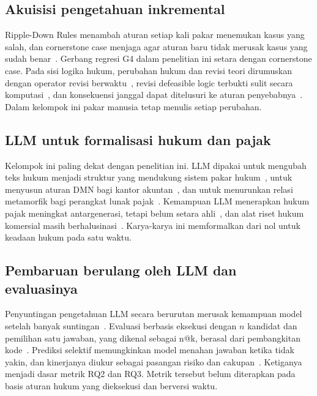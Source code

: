 \documentclass[journal,a4paper]{IEEEtran}
\makeatletter
\DeclareRobustCommand{\en}[1]{{\usefont{\f@encoding}{\f@family}{\f@series}{it}#1\/}}
\makeatother
\begin{document}
\subsection{Akuisisi pengetahuan inkremental}
\en{Ripple-Down Rules} menambah aturan setiap kali pakar menemukan kasus yang salah, dan \en{cornerstone case} menjaga agar aturan baru tidak merusak kasus yang sudah benar~\cite{compton2021rdr}. Gerbang regresi G4 dalam penelitian ini setara dengan \en{cornerstone case}. Pada sisi logika hukum, perubahan hukum dan revisi teori dirumuskan dengan operator revisi berwaktu~\cite{moguillansky2024temporalised}, revisi \en{defeasible logic} terbukti sulit secara komputasi~\cite{olivieri2025revising}, dan konsekuensi janggal dapat ditelusuri ke aturan penyebabnya~\cite{fungwacharakorn2021debugging}. Dalam kelompok ini pakar manusia tetap menulis setiap perubahan.

\subsection{LLM untuk formalisasi hukum dan pajak}
Kelompok ini paling dekat dengan penelitian ini. LLM dipakai untuk mengubah teks hukum menjadi struktur yang mendukung sistem pakar hukum~\cite{janatian2023texttostructure}, untuk menyusun aturan DMN bagi kantor akuntan~\cite{makowski2025dmn}, dan untuk menurunkan relasi metamorfik bagi perangkat lunak pajak~\cite{srinivas2023fewshot,khiabani2026agentic}. Kemampuan LLM menerapkan hukum pajak meningkat antargenerasi, tetapi belum setara ahli~\cite{blairstanek2023gpt3,nay2024taxattorneys}, dan alat riset hukum komersial masih berhalusinasi~\cite{magesh2025hallucination}. Karya-karya ini memformalkan dari nol untuk keadaan hukum pada satu waktu.

\subsection{Pembaruan berulang oleh LLM dan evaluasinya}
Penyuntingan pengetahuan LLM secara berurutan merusak kemampuan model setelah banyak suntingan~\cite{gupta2024editing}. Evaluasi berbasis eksekusi dengan $n$ kandidat dan pemilihan satu jawaban, yang dikenal sebagai \en{n@k}, berasal dari pembangkitan kode~\cite{li2022alphacode}. Prediksi selektif memungkinkan model menahan jawaban ketika tidak yakin, dan kinerjanya diukur sebagai pasangan risiko dan cakupan~\cite{xin2021abstention}. Ketiganya menjadi dasar metrik RQ2 dan RQ3. Metrik tersebut belum diterapkan pada basis aturan hukum yang dieksekusi dan berversi waktu.
\end{document}
